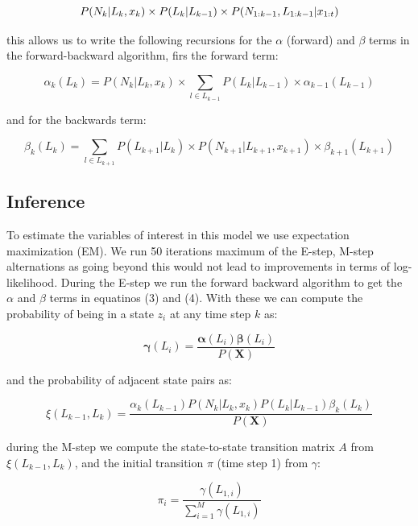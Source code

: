\documentclass{article}
\begin{document}
\begin{equation}
    P(N_k | L_k, x_k) \times P(L_k | L_{k-1}) \times P(\Nkm1, \Lkm1 | \xm)
\end{equation}

\noindent
this allows us to write the following recursions for the $\alpha$ (forward) and $\beta$ terms in the forward-backward algorithm, firs the forward term:

\begin{equation}
     \alpha_{k}(L_k) = P(N_k | L_k, x_k) \times \sum_{l \in L_{k-1}} P(L_k | L_{k-1}) \times \alpha_{k-1}(L_{k-1})
\end{equation}

\noindent
and for the backwards term:
 
 \begin{equation}
    \beta_k(L_k) =  \sum_{l \in L_{k+1}}P(L_{k+1} | L_k)  \times P(N_{k+1} | L_{k+1}, x_{k+1}) \times \beta_{k+1}(L_{k+1})
\end{equation}


\subsection{Inference}
To estimate the variables of interest in this model we use expectation maximization (EM). We run 50 iterations maximum of the E-step, M-step alternations as going beyond this would not lead to improvements in terms of log-likelihood.  During the E-step we run the forward backward algorithm to get the $\alpha$ and $\beta$ terms in equatinos (3) and (4). With these we can compute the probability of being in a state $z_i$ at any time step $k$ as: 

\begin{equation}
    \boldsymbol{\gamma}(L_i) = \frac{\boldsymbol{\alpha}(L_i) \boldsymbol{\beta}(L_i)}{P(\boldsymbol{X})}
\end{equation}

\noindent
and the probability of adjacent state pairs as:

\begin{equation}
    \xi(L_{k-1}, L_k) = \frac{\alpha_k(L_{k-1})P(N_k | L_k, x_k)P(L_k | L_{k-1})\beta_k(L_k)}{P(\boldsymbol{X})}
\end{equation}

\noindent
during the M-step we compute the state-to-state transition matrix $A$ from $\xi(L_{k-1}, L_k)$, and the initial transition $\pi$ (time step 1) from $\gamma$:

\begin{equation}
    \pi_i = \frac{\gamma(L_{1, i})}{\sum_{i=1}^M \gamma(L_{1, i})}
\end{equation}
\end{document}
